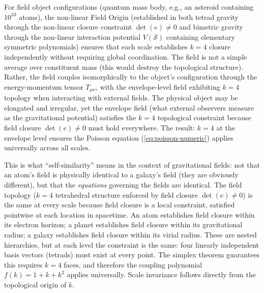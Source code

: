 For field object configurations (quantum mass body, e.g., an asteroid containing $10^{33}$ atoms), the non-linear Field Origin (established in both tetrad gravity through the non-linear closure constraint $\det(e) \neq 0$ and bimetric gravity through the non-linear interaction potential $V(\mathcal{S})$ containing elementary symmetric polynomials) ensures that each scale establishes $k=4$ closure independently without requiring global coordination. The field is not a simple average over constituent mass (this would destroy the topological structure). Rather, the field couples isomorphically to the object's configuration through the energy-momentum tensor $T_{\mu\nu}$, with the envelope-level field exhibiting $k=4$ topology when interacting with external fields. The physical object may be elongated and irregular, yet the envelope field (what external observers measure as the gravitational potential) satisfies the $k=4$ topological constraint because field closure $\det(e) \neq 0$ must hold everywhere. The result: $k=4$ at the envelope level ensures the Poisson equation (\ref{eq:poisson-numeric}) applies universally across all scales.


This is what ``self-similarity'' means in the context of gravitational fields: not that an atom's field is physically identical to a galaxy's field (they are obviously different), but that the \emph{equations} governing the fields are identical. The field topology ($k=4$ tetrahedral structure enforced by field closure $\det(e) \neq 0$) is the same at every scale because field closure is a local constraint, satisfied pointwise at each location in spacetime. An atom establishes field closure within its electron horizon; a planet establishes field closure within its gravitational radius; a galaxy establishes field closure within its virial radius. These are nested hierarchies, but at each level the constraint is the same: four linearly independent basis vectors (tetrads) must exist at every point. The simplex theorem guarantees this requires $k=4$ faces, and therefore the coupling polynomial $f(k) = 1 + k + k^2$ applies universally. Scale invariance follows directly from the topological origin of $k$.

